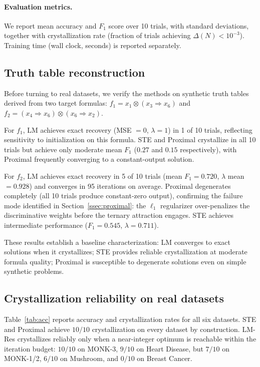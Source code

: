 \documentclass[12pt,a4paper]{article}
\newcommand{\tnorm}{\otimes}      %
\newcommand{\resid}{\Rightarrow}  %
\begin{document}
\paragraph{Evaluation metrics.}
We report mean accuracy and $F_1$ score over 10 trials, with standard
deviations, together with crystallization rate (fraction of trials achieving
$\Delta(N) < 10^{-3}$).
Training time (wall clock, seconds) is reported separately.

\subsection{Truth table reconstruction}
\label{ssec:tt}

Before turning to real datasets, we verify the methods on synthetic truth
tables derived from two target formulas:
$f_1 = x_1 \tnorm (x_3 \resid x_6)$ and
$f_2 = (x_4 \resid x_6) \tnorm (x_6 \resid x_2)$.

For $f_1$, LM achieves exact recovery (MSE $= 0$, $\lambda = 1$) in 1 of 10 trials,
reflecting sensitivity to initialization on this formula.
STE and Proximal crystallize in all 10 trials but achieve only moderate mean
$F_1$ ($0.27$ and $0.15$ respectively), with Proximal frequently converging
to a constant-output solution.

For $f_2$, LM achieves exact recovery in 5 of 10 trials
(mean $F_1 = 0.720$, $\lambda$ mean $= 0.928$) and converges in 95 iterations
on average.
Proximal degenerates completely (all 10 trials produce constant-zero output),
confirming the failure mode identified in Section~\ref{ssec:proximal}:
the $\ell_1$ regularizer over-penalizes the discriminative weights before
the ternary attraction engages.
STE achieves intermediate performance ($F_1 = 0.545$, $\lambda = 0.711$).

These results establish a baseline characterization: LM converges to exact
solutions when it crystallizes; STE provides reliable crystallization at
moderate formula quality; Proximal is susceptible to degenerate solutions even
on simple synthetic problems.

\subsection{Crystallization reliability on real datasets}
\label{ssec:cryst_real}

Table~\ref{tab:acc} reports accuracy and crystallization rates for all six
datasets.
STE and Proximal achieve $10/10$ crystallization on every dataset by
construction.
LM-Res crystallizes reliably only when a near-integer optimum is reachable
within the iteration budget: $10/10$ on MONK-3, $9/10$ on Heart Disease,
but $7/10$ on MONK-1/2, $6/10$ on Mushroom, and $0/10$ on Breast Cancer.
\end{document}

